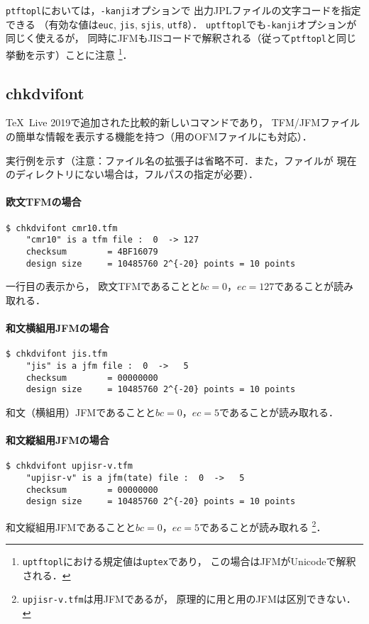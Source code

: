 \documentclass[a4paper,11pt,nomag]{jsarticle}
\def\size#1{\mathit{#1}}
\def\code#1{\texttt{#1}}
\begin{document}
\code{ptftopl}においては，\code{-kanji}オプションで
出力JPLファイルの文字コードを指定できる
（有効な値は\code{euc}, \code{jis}, \code{sjis}, \code{utf8}）．
\code{uptftopl}でも\code{-kanji}オプションが同じく使えるが，
同時にJFMもJISコードで解釈される（従って\code{ptftopl}と同じ挙動を示す）ことに注意
\footnote{\code{uptftopl}における規定値は\code{uptex}であり，
この場合はJFMがUnicodeで解釈される．}．

\subsection{chkdvifont}

\TeX\ Live 2019で追加された比較的新しいコマンドであり，
TFM/JFMファイルの簡単な情報を表示する機能を持つ（\OMEGA 用のOFMファイルにも対応）．

実行例を示す（注意：ファイル名の拡張子は省略不可．また，ファイルが
現在のディレクトリにない場合は，フルパスの指定が必要）．

\paragraph{欧文TFMの場合}
\begin{verbatim}
$ chkdvifont cmr10.tfm
    "cmr10" is a tfm file :  0  -> 127
    checksum        = 4BF16079
    design size     = 10485760 2^{-20} points = 10 points
\end{verbatim}
一行目の表示から，
欧文TFMであることと$\size{bc}=0$，$\size{ec}=127$であることが読み取れる．

\paragraph{和文横組用JFMの場合}
\begin{verbatim}
$ chkdvifont jis.tfm
    "jis" is a jfm file :  0  ->   5
    checksum        = 00000000
    design size     = 10485760 2^{-20} points = 10 points
\end{verbatim}
和文（横組用）JFMであることと$\size{bc}=0$，$\size{ec}=5$であることが読み取れる．

\paragraph{和文縦組用JFMの場合}
\begin{verbatim}
$ chkdvifont upjisr-v.tfm
    "upjisr-v" is a jfm(tate) file :  0  ->   5
    checksum        = 00000000
    design size     = 10485760 2^{-20} points = 10 points
\end{verbatim}
和文縦組用JFMであることと$\size{bc}=0$，$\size{ec}=5$であることが読み取れる
\footnote{\code{upjisr-v.tfm}は\upTeX 用JFMであるが，
原理的に\pTeX 用と\upTeX 用のJFMは区別できない．}．
\end{document}
